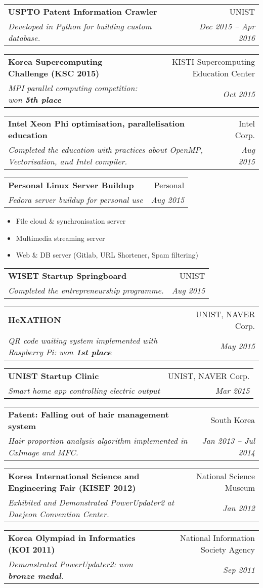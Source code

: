 \documentclass[letterpaper,11pt]{article}
\makeatletter
\newcommand{\resumeSimpleItem}[1]{
  \item\small{
    {#1 \vspace{-2pt}}
  }
}
\newcommand{\resumeSubheading}[4]{
  \vspace{-1pt}\item
    \begin{tabular*}{0.97\textwidth}{l@{\extracolsep{\fill}}r}
      \textbf{#1} & #2 \\
      \textit{\small#3} & \textit{\small #4} \\
    \end{tabular*}\vspace{-5pt}
}
\newcommand{\resumeItemListStart}{\begin{itemize}}
\newcommand{\resumeItemListEnd}{\end{itemize}\vspace{-5pt}}
\makeatother
\begin{document}
      
    \ifdefined {}
    \resumeSubheading
      {USPTO Patent Information Crawler}{UNIST}
      {Developed in Python for building custom database.}{Dec 2015 -- Apr 2016}
    \fi
      
    \resumeSubheading
      {Korea Supercomputing Challenge (KSC 2015)}{KISTI Supercomputing Education Center}
      {MPI parallel computing competition: won \textbf{5th place}}{Oct 2015}
      
    \ifdefined {}
    \resumeSubheading
      {Intel Xeon Phi optimisation, parallelisation education}{Intel Corp.}
      {Completed the education with practices about OpenMP, Vectorisation, and Intel compiler.}{Aug 2015}
    \fi
      
    \ifdefined {}
    \resumeSubheading
      {Personal Linux Server Buildup}{Personal}
      {Fedora server buildup for personal use}{Aug 2015}
      \resumeItemListStart
        \resumeSimpleItem{File cloud \& synchronisation server}
        \resumeSimpleItem{Multimedia streaming server}
        \resumeSimpleItem{Web \& DB server (Gitlab, URL Shortener, Spam filtering)}
      \resumeItemListEnd
    \fi
      
    \ifdefined {}
    \resumeSubheading
      {WISET Startup Springboard}{UNIST}
      {Completed the entrepreneurship programme.}{Aug 2015}
    \fi
    

      
    \resumeSubheading
      {HeXATHON}{UNIST, NAVER Corp.}
      {QR code waiting system implemented with Raspberry Pi: won \textbf{1st place}}{May 2015}
      
    \ifdefined {}
    \resumeSubheading
      {UNIST Startup Clinic}{UNIST, NAVER Corp.}
      {Smart home app controlling electric output}{Mar 2015}
    \fi
    

      
    \ifx \disallowBlankTerm{} \undefined
    \resumeSubheading
      {Patent: Falling out of hair management system}{South Korea}
      {Hair proportion analysis algorithm implemented in CxImage and MFC.}{Jan 2013 -- Jul 2014}
    \fi
      
    \resumeSubheading
      {Korea International Science and Engineering Fair (KISEF 2012)}{National Science Museum}
      {Exhibited and Demonstrated PowerUpdater2 at Daejeon Convention Center.}{Jan 2012}
      
    \resumeSubheading
      {Korea Olympiad in Informatics (KOI 2011)}{National Information Society Agency}
      {Demonstrated PowerUpdater2: won \textbf{bronze medal}.}{Sep 2011}
      
\end{document}
